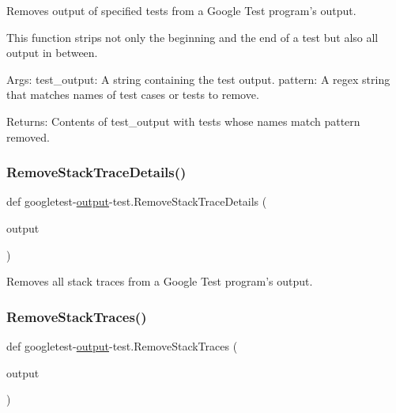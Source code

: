 \begin{DoxyVerb}Removes output of specified tests from a Google Test program's output.

This function strips not only the beginning and the end of a test but also
all output in between.

Args:
  test_output:       A string containing the test output.
  pattern:           A regex string that matches names of test cases or
                     tests to remove.

Returns:
  Contents of test_output with tests whose names match pattern removed.
\end{DoxyVerb}
 \mbox{\label{namespacegoogletest-output-test_ae092cb89e71f6dd2f9e4c403ee43ee64}} 
\subsubsection{\texorpdfstring{RemoveStackTraceDetails()}{RemoveStackTraceDetails()}}
{\footnotesize\ttfamily def googletest-\/\mbox{\hyperlink{namespacegoogletest-output-test_ab3df9ce09186215a36c30454cf282417}{output}}-\/test.\+Remove\+Stack\+Trace\+Details (\begin{DoxyParamCaption}\item[{}]{output }\end{DoxyParamCaption})}

\begin{DoxyVerb}Removes all stack traces from a Google Test program's output.\end{DoxyVerb}
 \mbox{\label{namespacegoogletest-output-test_a15cad04cb1410747f1aeda3d113135fa}} 
\subsubsection{\texorpdfstring{RemoveStackTraces()}{RemoveStackTraces()}}
{\footnotesize\ttfamily def googletest-\/\mbox{\hyperlink{namespacegoogletest-output-test_ab3df9ce09186215a36c30454cf282417}{output}}-\/test.\+Remove\+Stack\+Traces (\begin{DoxyParamCaption}\item[{}]{output }\end{DoxyParamCaption})}

